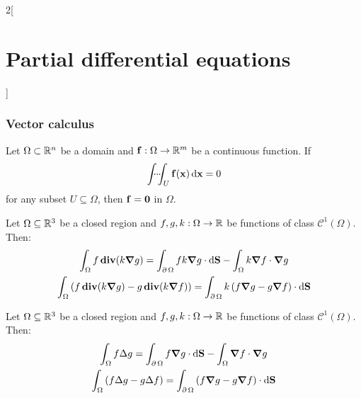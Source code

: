 \documentclass[../../../main_math.tex]{subfiles}
\begin{document}
\begin{multicols}{2}[\section{Partial differential equations}]
  \subsubsection{Vector calculus}
  \begin{theorem}
    Let $\Omega\subset\mathbb{R}^n$ be a domain and $\boldsymbol{\mathrm{f}}:\Omega\rightarrow\mathbb{R}^m$ be a continuous function. If $$\dotsint_U \vf{f}(\vf{x})\dd{\vf{x}}=0$$ for any subset  $U\subseteq\Omega$, then $\boldsymbol{\mathrm{f}}=\boldsymbol{\mathrm{0}}$ in $\Omega$.
  \end{theorem}
  \begin{proposition}
    Let $\Omega\subseteq\mathbb{R}^3$ be a closed region and $f,g,k:\Omega\rightarrow\mathbb{R}$ be functions of class $\mathcal{C}^1(\Omega)$. Then:
    \begin{gather*}
      \int_\Omega f\operatorname{\boldsymbol{\mathrm{div}}}(k\grad{g})                                =\int_{\operatorname{\partial}{\Omega}}fk\grad{g}\cdot\dd{\boldsymbol{\mathrm{S}}} -\int_\Omega k\grad{f}\cdot\grad{g} \\
      \int_\Omega \left(f\operatorname{\boldsymbol{\mathrm{div}}}(k\grad{g})-g\operatorname{\boldsymbol{\mathrm{div}}}(k\grad{f})\right)  =\int_{\operatorname{\partial}{\Omega}} k\left(f\grad{g}-g\grad{f}\right)\cdot\dd{\boldsymbol{\mathrm{S}}}
    \end{gather*}
  \end{proposition}
  \begin{corollary}
    Let $\Omega\subseteq\mathbb{R}^3$ be a closed region and $f,g,k:\Omega\rightarrow\mathbb{R}$ be functions of class $\mathcal{C}^1(\Omega)$. Then:
    \begin{gather*}
      \int_\Omega f\Delta{g}                              =\int_{\operatorname{\partial}{\Omega}}f\grad{g}\cdot\dd{\boldsymbol{\mathrm{S}}} -\int_\Omega \grad{f}\cdot\grad{g} \\
      \int_\Omega \left(f\Delta{g}-g\Delta{f}\right)  =\int_{\operatorname{\partial}{\Omega}} \left(f\grad{g}-g\grad{f}\right)\cdot\dd{\boldsymbol{\mathrm{S}}}
    \end{gather*}
  \end{corollary}

\end{multicols}
\end{document}
